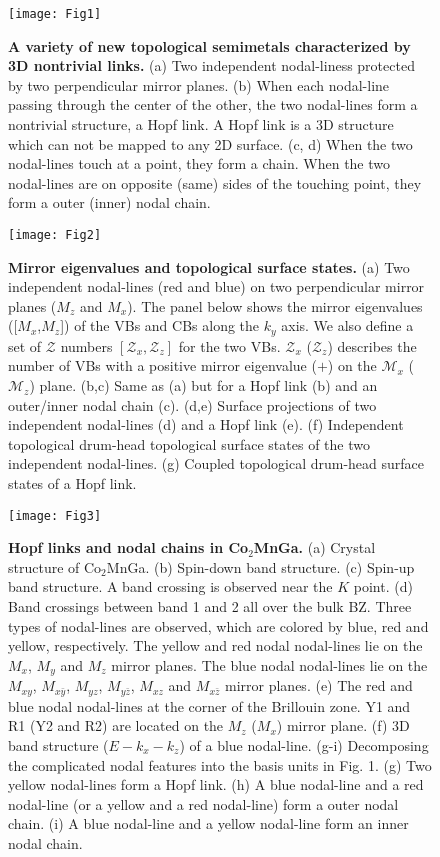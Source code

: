 \documentclass[aps,prl,superscriptaddress,twocolumn,showpacs]{revtex4-1}
\begin{document}
\begin{figure}
\texttt{[image: Fig1]}
\caption{\textbf{A variety of new topological semimetals characterized by 3D nontrivial links.} ({a}) Two independent nodal-liness protected by two perpendicular mirror planes. ({b}) When each nodal-line passing through the center of the other, the two nodal-lines form a nontrivial structure, a Hopf link. A Hopf link is a 3D structure which can not be mapped to any 2D surface. ({c, d}) When the two nodal-lines touch at a point, they form a chain. When the two nodal-lines are on opposite (same) sides of the touching point, they form a outer (inner) nodal chain.}
\label{Fig1}
\end{figure}


\begin{figure}
\texttt{[image: Fig2]}
\caption{\textbf{Mirror eigenvalues and topological surface states.} ({a}) Two independent nodal-lines (red and blue) on two perpendicular mirror planes ($M_{z}$ and $M_{x}$). The panel below shows the mirror eigenvalues ([$M_{x}$,$M_{z}$]) of the VBs and CBs along the $k_{y}$ axis. We also define a set of $\mathcal{Z}$ numbers $[\mathcal{Z}_x, \mathcal{Z}_z]$ for the two VBs. $\mathcal{Z}_x$ ($\mathcal{Z}_z$) describes the number of VBs with a positive mirror eigenvalue ($+$) on the $\mathcal{M}_x$ ($\mathcal{M}_z$) plane. ({b,c}) Same as (a) but for a Hopf link (b) and an outer/inner nodal chain (c). ({d,e}) Surface projections of two independent nodal-lines (d) and a Hopf link (e). ({f}) Independent topological drum-head topological surface states of the two independent nodal-lines. ({g}) Coupled topological drum-head surface states of a Hopf link.}
\label{Fig2}
\end{figure}

\begin{figure}
\texttt{[image: Fig3]}
\caption{ \textbf{Hopf links and nodal chains in Co$_{2}$MnGa.} ({a}) Crystal structure of Co$_{2}$MnGa. ({b}) Spin-down band structure. ({c}) Spin-up band structure. A band crossing is observed near the $K$ point. ({d}) Band crossings between band 1 and 2 all over the bulk BZ. Three types of nodal-lines are observed, which are colored by blue, red and yellow, respectively. The yellow and red nodal nodal-lines lie on the $M_{x}$, $M_{y}$ and $M_{z}$ mirror planes. The blue nodal nodal-lines lie on the $M_{xy}$, $M_{x\bar{y}}$, $M_{yz}$, $M_{y\bar{z}}$, $M_{xz}$ and $M_{x\bar{z}}$ mirror planes. ({e}) The red and blue nodal nodal-lines at the corner of the Brillouin zone. Y1 and R1 (Y2 and R2) are located on the $M_{z}$ ($M_{x}$) mirror plane. ({f}) 3D band structure ($E-k_x-k_z$) of a blue nodal-line. ({g-i}) Decomposing the complicated nodal features into the basis units in Fig. 1. ({g}) Two yellow nodal-lines form a Hopf link. ({h}) A blue nodal-line and a red nodal-line (or a yellow and a red nodal-line) form a outer nodal chain. ({i}) A blue nodal-line and a yellow nodal-line form an inner nodal chain.}
 \label{Fig3}
\end{figure}
\end{document}
